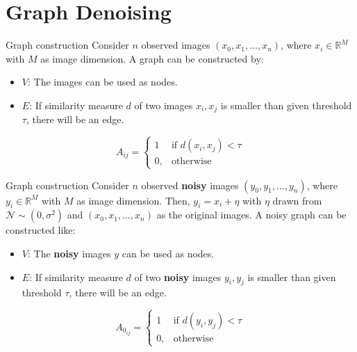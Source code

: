 \documentclass[aspectratio=169]{beamer}
\begin{document}
\section{Graph Denoising}

\begin{frame}{Graph construction}
    Consider $n$ observed images $(x_0, x_1, \dots, x_n)$, where $x_i \in \mathbb{R}^M$ with $M$ as image dimension.
    A graph can be constructed by:
    \begin{itemize}
        \item $V$: The images can be used as nodes.
        \item $E$: If similarity measure $d$ of two images $x_i, x_j$ is smaller than given threshold $\tau$, there will be an edge.
     \end{itemize}

     \pause
     \begin{definition}
        \begin{equation}
            \label{eq:graphConstruction}
            A_{ij} =    
            \begin{cases}
                1  & \text{if } d(x_i, x_j) < \tau\\
                0, & \text{otherwise}
            \end{cases}
        \end{equation}
    \end{definition}
\end{frame}

\begin{frame}{Graph construction}
    Consider $n$ observed \textbf{noisy} images $(y_0, y_1, \dots, y_n)$, where $y_i \in \mathbb{R}^M$ with $M$ as image dimension.
    Then, $y_i = x_i + \eta$ with $\eta$ drawn from $\mathcal{N} \sim (0, \sigma^2)$ and $(x_0, x_1, \dots, x_n)$
    as the original images.
    A noisy graph can be constructed like:
    \begin{itemize}
        \item $V$: The \textbf{noisy} images $y$ can be used as nodes.
        \item $E$: If similarity measure $d$ of two \textbf{noisy} images $y_i, y_j$ is smaller than given threshold $\tau$, there will be an edge.
     \end{itemize}

     \pause

     \begin{definition}
        \begin{equation}
            \label{eq:graphConstructionNoise}
            A_{0_{ij}} =    
            \begin{cases}
                1  & \text{if } d(y_i, y_j) < \tau\\
                0, & \text{otherwise}
            \end{cases}
        \end{equation}    
     \end{definition}
\end{frame}
\end{document}
